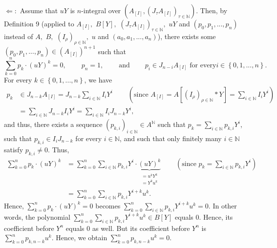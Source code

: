\documentclass[12pt,final,notitlepage,onecolumn]{article}%
\begin{document}
$\Longleftarrow:$ Assume that $uY$ is $n$-integral over $\left(  A_{\left[
I\right]  },\left(  J_{\tau}A_{\left[  I\right]  }\right)  _{\tau\in
\mathbb{N}}\right)  $. Then, by Definition 9 (applied to $A_{\left[  I\right]
},$ $B\left[  Y\right]  ,$ $\left(  J_{\tau}A_{\left[  I\right]  }\right)
_{\tau\in\mathbb{N}},$ $uY$ and $\left(  p_{0},p_{1},...,p_{n}\right)  $
instead of $A,$ $B,$ $\left(  I_{\rho}\right)  _{\rho\in\mathbb{N}},$ $u$ and
$\left(  a_{0},a_{1},...,a_{n}\right)  $), there exists some $\left(
p_{0},p_{1},...,p_{n}\right)  \in\left(  A_{\left[  I\right]  }\right)
^{n+1}$ such that%
\[
\sum\limits_{k=0}^{n}p_{k}\cdot\left(  uY\right)  ^{k}%
=0,\ \ \ \ \ \ \ \ \ \ p_{n}=1,\ \ \ \ \ \ \ \ \ \ \text{and}%
\ \ \ \ \ \ \ \ \ \ p_{i}\in J_{n-i}A_{\left[  I\right]  }\text{ for every
}i\in\left\{  0,1,...,n\right\}  .
\]
For every $k\in\left\{  0,1,...,n\right\}  $, we have%
\begin{align*}
p_{k}  &  \in J_{n-k}A_{\left[  I\right]  }=J_{n-k}\sum\limits_{i\in
\mathbb{N}}I_{i}Y^{i}\ \ \ \ \ \ \ \ \ \ \left(  \text{since }A_{\left[
I\right]  }=A\left[  \left(  I_{\rho}\right)  _{\rho\in\mathbb{N}}\ast
Y\right]  =\sum\limits_{i\in\mathbb{N}}I_{i}Y^{i}\right) \\
&  =\sum\limits_{i\in\mathbb{N}}J_{n-k}I_{i}Y^{i}=\sum\limits_{i\in\mathbb{N}%
}I_{i}J_{n-k}Y^{i},
\end{align*}
and thus, there exists a sequence $\left(  p_{k,i}\right)  _{i\in\mathbb{N}%
}\in A^{\mathbb{N}}$ such that $p_{k}=\sum\limits_{i\in\mathbb{N}}p_{k,i}%
Y^{i}$, such that $p_{k,i}\in I_{i}J_{n-k}$ for every $i\in\mathbb{N}$, and
such that only finitely many $i\in\mathbb{N}$ satisfy $p_{k,i}\neq0$. Thus,%
\begin{align*}
\sum\limits_{k=0}^{n}p_{k}\cdot\left(  uY\right)  ^{k}  &  =\sum
\limits_{k=0}^{n}\sum\limits_{i\in\mathbb{N}}p_{k,i}Y^{i}\cdot
\underbrace{\left(  uY\right)  ^{k}}_{\substack{=u^{k}Y^{k}\\=Y^{k}u^{k}%
}}\ \ \ \ \ \ \ \ \ \ \left(  \text{since }p_{k}=\sum\limits_{i\in\mathbb{N}%
}p_{k,i}Y^{i}\right) \\
&  =\sum\limits_{k=0}^{n}\sum\limits_{i\in\mathbb{N}}p_{k,i}Y^{i+k}u^{k}.
\end{align*}
Hence, $\sum\limits_{k=0}^{n}p_{k}\cdot\left(  uY\right)  ^{k}=0$ becomes
$\sum\limits_{k=0}^{n}\sum\limits_{i\in\mathbb{N}}p_{k,i}Y^{i+k}u^{k}=0$. In
other words, the polynomial $\sum\limits_{k=0}^{n}\sum\limits_{i\in\mathbb{N}%
}p_{k,i}Y^{i+k}u^{k}\in B\left[  Y\right]  $ equals $0$. Hence, its
coefficient before $Y^{n}$ equals $0$ as well. But its coefficient before
$Y^{n}$ is $\sum\limits_{k=0}^{n}p_{k,n-k}u^{k}$. Hence, we obtain
$\sum\limits_{k=0}^{n}p_{k,n-k}u^{k}=0$.
\end{document}
